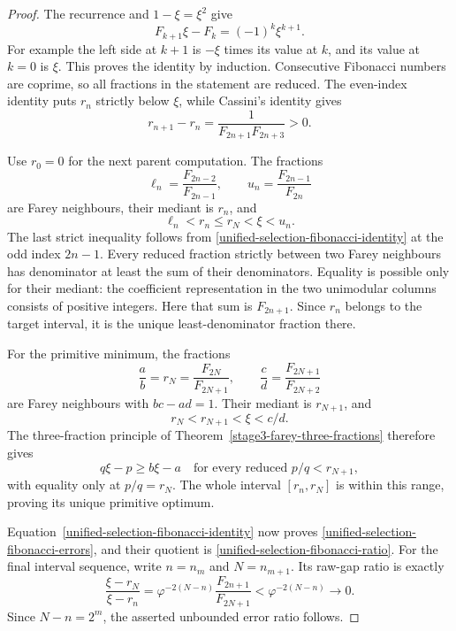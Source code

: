 \documentclass[11pt,a4paper]{article}
\theoremstyle{definition}
\theoremstyle{remark}
\begin{document}
\begin{proof}
The recurrence and $1-\xi=\xi^2$ give
\begin{equation}\label{unified-selection-fibonacci-identity}
 F_{k+1}\xi-F_k=(-1)^k\xi^{k+1}.
\end{equation}
For example the left side at $k+1$ is $-\xi$ times its value at $k$,
and its value at $k=0$ is $\xi$. This proves the identity by induction.
Consecutive Fibonacci numbers are coprime, so all fractions in the
statement are reduced. The even-index identity puts $r_n$ strictly below
$\xi$, while Cassini's identity gives
\[
 r_{n+1}-r_n=\frac1{F_{2n+1}F_{2n+3}}>0.
\]

Use $r_0=0$ for the next parent computation. The fractions
\[
 \ell_n=\frac{F_{2n-2}}{F_{2n-1}},\qquad
 u_n=\frac{F_{2n-1}}{F_{2n}}
\]
are Farey neighbours, their mediant is $r_n$, and
\[
 \ell_n<r_n\le r_N<\xi<u_n.
\]
The last strict inequality follows from
\eqref{unified-selection-fibonacci-identity} at the odd index $2n-1$.
Every reduced fraction strictly between two Farey neighbours has
denominator at least the sum of their denominators. Equality is possible
only for their mediant: the coefficient representation in the two
unimodular columns consists of positive integers. Here that sum is
$F_{2n+1}$. Since $r_n$ belongs to the target interval, it is the unique
least-denominator fraction there.

For the primitive minimum, the fractions
\[
 \frac ab=r_N=\frac{F_{2N}}{F_{2N+1}},\qquad
 \frac cd=\frac{F_{2N+1}}{F_{2N+2}}
\]
are Farey neighbours with $bc-ad=1$. Their mediant is
$r_{N+1}$, and
\[
 r_N<r_{N+1}<\xi<c/d.
\]
The three-fraction principle of
Theorem~\ref{stage3-farey-three-fractions} therefore gives
\[
 q\xi-p\ge b\xi-a
 \quad\text{for every reduced }p/q<r_{N+1},
\]
with equality only at $p/q=r_N$. The whole interval $[r_n,r_N]$ is
within this range, proving its unique primitive optimum.

Equation~\eqref{unified-selection-fibonacci-identity} now proves
\eqref{unified-selection-fibonacci-errors}, and their quotient is
\eqref{unified-selection-fibonacci-ratio}. For the final interval
sequence, write $n=n_m$ and $N=n_{m+1}$. Its raw-gap ratio is exactly
\[
 \frac{\xi-r_N}{\xi-r_n}
 =\varphi^{-2(N-n)}\frac{F_{2n+1}}{F_{2N+1}}
 <\varphi^{-2(N-n)}\longrightarrow0.
\]
Since $N-n=2^m$, the asserted unbounded error ratio follows.
\end{proof}
\end{document}
